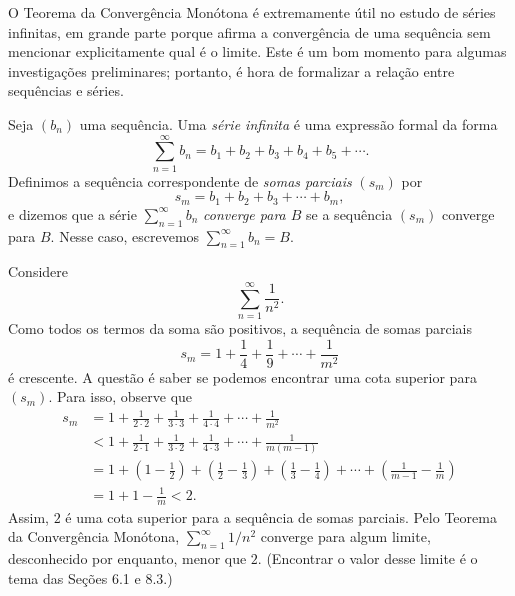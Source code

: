 O Teorema da Convergência Monótona é extremamente útil no estudo de séries infinitas, em grande parte porque afirma a convergência de uma sequência sem mencionar explicitamente qual é o limite. Este é um bom momento para algumas investigações preliminares; portanto, é hora de formalizar a relação entre sequências e séries.

   
\begin{definition}\label{def:convergencia-serie}
Seja $(b_n)$ uma sequência. Uma \textit{série infinita} é uma expressão formal da forma
\[
\sum_{n=1}^{\infty}b_n=b_1+b_2+b_3+b_4+b_5+\cdots.
\]
Definimos a sequência correspondente de \textit{somas parciais} $(s_m)$ por
\[
s_m=b_1+b_2+b_3+\cdots+b_m,
\]
e dizemos que a série $\sum_{n=1}^{\infty}b_n$ \textit{converge para $B$} se a sequência $(s_m)$ converge para $B$. Nesse caso, escrevemos $\sum_{n=1}^{\infty}b_n=B$.
\end{definition}

\begin{example}\label{exmpl:2-4-4}
Considere
\[
\sum_{n=1}^{\infty}\frac{1}{n^2}.
\]
Como todos os termos da soma são positivos, a sequência de somas parciais
\[
s_m=1+\frac14+\frac19+\cdots+\frac{1}{m^2}
\]
é crescente. A questão é saber se podemos encontrar uma cota superior para $(s_m)$. Para isso, observe que
\[
\begin{aligned}
s_m&=1+\frac{1}{2\cdot2}+\frac{1}{3\cdot3}+\frac{1}{4\cdot4}+\cdots+\frac{1}{m^2}\\
&<1+\frac{1}{2\cdot1}+\frac{1}{3\cdot2}+\frac{1}{4\cdot3}+\cdots+\frac{1}{m(m-1)}\\
&=1+\left(1-\frac12\right)+\left(\frac12-\frac13\right)+\left(\frac13-\frac14\right)+\cdots+\left(\frac{1}{m-1}-\frac1m\right)\\
&=1+1-\frac1m<2.
\end{aligned}
\]
Assim, $2$ é uma cota superior para a sequência de somas parciais. Pelo Teorema da Convergência Monótona, $\sum_{n=1}^{\infty}1/n^2$ converge para algum limite, desconhecido por enquanto, menor que $2$. (Encontrar o valor desse limite é o tema das Seções 6.1 e 8.3.) 
\end{example}

